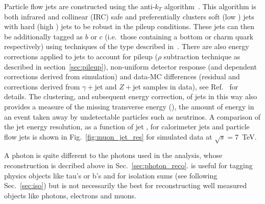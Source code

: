 Particle flow jets are constructed using the anti-$k_{T}$ algorithm~\cite{anti_kt_algo}. This algorithm is both infrared and collinear (IRC) safe and preferentially clusters soft (low \pT) jets with hard (high \pT) jets to be robust in the \LHC pileup conditions. These jets can then be additionally tagged as $b$ or $c$ (i.e.~those containing a bottom or charm quark respectively) using techniques of the type described in~\cite{b_tag}. There are also energy corrections applied to jets to account for pileup ($\rho$ subtraction technique as described in section~\ref{sec:pileup}), non-uniform detector response (\pT and \eta dependent corrections derived from \MC simulation) and data-MC differences (residual \pT and \eta corrections derived from $\gamma+$jet and $Z+$jet samples in data), see Ref.~\cite{jet_e_corrs} for details. The clustering, and subsequent energy correction, of jets in this way also provides a measure of the missing transverse energy (\MET), the amount of energy in an event taken away by undetectable particles such as neutrinos. A comparison of the jet energy resolution, as a function of jet \pT, for calorimeter jets and particle flow jets is shown in Fig.~\ref{fig:muon_jet_res} for simulated data at $\sqrt{s}=7$~TeV.

A \PF photon is quite different to the photons used in the analysis, whose reconstruction is decribed above in Sec.~\ref{sec:photon_reco}. \PF is useful for tagging physics objects like tau's or b's and for isolation sums (see following Sec.~\ref{sec:iso}) but is not necessarily the best for reconstructing well measured objects like photons, electrons and muons.

